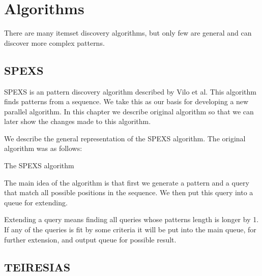 \chapter{Algorithms}

There are many itemset discovery algorithms, but only few are general and can discover more complex patterns.

\section{SPEXS}

SPEXS is an pattern discovery algorithm described by Vilo et al.
This algorithm finds patterns from a sequence.
We take this as our basis for developing a new parallel algorithm.
In this chapter we describe original algorithm so that we can
later show the changes made to this algorithm.

We describe the general representation of the SPEXS algorithm. 
The original algorithm was as follows:


\begin{algorithm}[H]
	\caption{The SPEXS algorithm}
\begin{algorithmic}[1]



				\EndIf
			\EndIf
		\EndFor
	\EndWhile
\end{algorithmic}
\end{algorithm}

The main idea of the algorithm is that first we generate a 
pattern and a query that match all possible positions in 
the sequence. We then put this query into a queue for extending.

Extending a query means finding all queries whose patterns length
is longer by 1. If any of the queries is fit by some criteria
it will be put into the main queue, for further extension, 
and output queue for possible result.


\section{TEIRESIAS}

